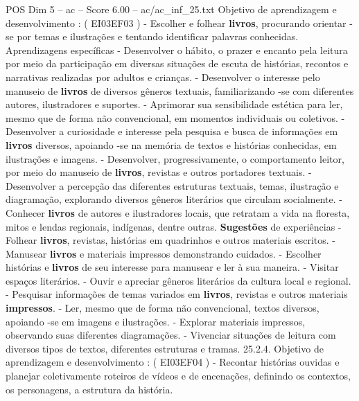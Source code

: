 \begin{textsample}{POS Dim 5 – ac – Score 6.00 – ac/ac\_inf\_25.txt}
Objetivo de aprendizagem e desenvolvimento : ( EI03EF03 ) - Escolher e folhear \textbf{livros}, procurando orientar -se por temas e ilustrações e tentando identificar palavras conhecidas.
Aprendizagens específicas - Desenvolver o hábito, o prazer e encanto pela leitura por meio da participação em diversas situações de escuta de histórias, recontos e narrativas realizadas por adultos e crianças. - Desenvolver o interesse pelo manuseio de \textbf{livros} de diversos gêneros textuais, familiarizando -se com diferentes autores, ilustradores e suportes. - Aprimorar sua sensibilidade estética para ler, mesmo que de forma não convencional, em momentos individuais ou coletivos. - Desenvolver a curiosidade e interesse pela pesquisa e busca de informações em \textbf{livros} diversos, apoiando -se na memória de textos e histórias conhecidas, em ilustrações e imagens. - Desenvolver, progressivamente, o comportamento leitor, por meio do manuseio de \textbf{livros}, revistas e outros portadores textuais. - Desenvolver a percepção das diferentes estruturas textuais, temas, ilustração e diagramação, explorando diversos gêneros literários que circulam socialmente. - Conhecer \textbf{livros} de autores e ilustradores locais, que retratam a vida na floresta, mitos e lendas regionais, indígenas, dentre outras. \textbf{Sugestões} de experiências - Folhear \textbf{livros}, revistas, histórias em quadrinhos e outros materiais escritos. - Manusear \textbf{livros} e materiais impressos demonstrando cuidados. - Escolher histórias e \textbf{livros} de seu interesse para manusear e ler à sua maneira. - Visitar espaços literários. - Ouvir e apreciar gêneros literários da cultura local e regional. - Pesquisar informações de temas variados em \textbf{livros}, revistas e outros materiais \textbf{impressos}. - Ler, mesmo que de forma não convencional, textos diversos, apoiando -se em imagens e ilustrações. - Explorar materiais impressos, observando suas diferentes diagramações. - Vivenciar situações de leitura com diversos tipos de textos, diferentes estruturas e tramas. 25.2.4.
Objetivo de aprendizagem e desenvolvimento : ( EI03EF04 ) - Recontar histórias ouvidas e planejar coletivamente roteiros de vídeos e de encenações, definindo os contextos, os personagens, a estrutura da história.

\end{textsample}
